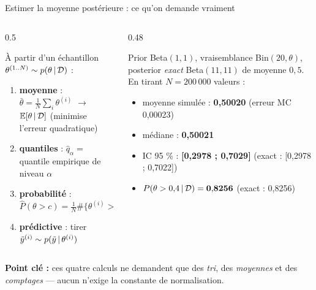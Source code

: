 \begin{frame}{Estimer la moyenne postérieure : ce qu'on demande vraiment}
\begin{columns}[t]
\begin{column}{0.5\textwidth}
\begin{kbox}
À partir d'un échantillon $\theta^{(1..N)} \sim p(\theta \,\vert\, \mathcal{D})$ :
\begin{enumerate}
  \item \textbf{moyenne} : $\bar\theta = \frac{1}{N}\sum_i \theta^{(i)}$
        $\rightarrow$ $\mathbb{E}[\theta \,\vert\, \mathcal{D}]$ (minimise l'erreur quadratique)
  \item \textbf{quantiles} : $\hat q_\alpha = $ quantile empirique de niveau $\alpha$
  \item \textbf{probabilité} : $\hat P(\theta > c) = \frac{1}{N}\#\{\theta^{(i)} > c\}$
  \item \textbf{prédictive} : tirer $\tilde y^{(i)} \sim p(\tilde y \,\vert\, \theta^{(i)})$
\end{enumerate}
\end{kbox}
\end{column}
\begin{column}{0.48\textwidth}
\begin{ebox}
Prior Beta$(1,1)$, vraisemblance Bin$(20, \theta)$, posterior \emph{exact}
Beta$(11,11)$ de moyenne $0{,}5$. En tirant $N = 200\,000$ valeurs :
\begin{itemize}
  \item moyenne simulée : \textbf{0,50020} (erreur MC 0,00023)
  \item médiane : \textbf{0,50021}
  \item IC 95 \% : \textbf{[0,2978 ; 0,7029]} \; (exact : [0,2978 ; 0,7022])
  \item $P(\theta > 0{,}4 \,\vert\, \mathcal{D}) = \mathbf{0{,}8256}$ \; (exact : 0,8256)
\end{itemize}
\end{ebox}
\end{column}
\end{columns}
\vspace{2mm}
\centering\small
\textbf{Point clé :} ces quatre calculs ne demandent que des \emph{tri}, des
\emph{moyennes} et des \emph{comptages} --- aucun n'exige la constante de
normalisation.
\end{frame}

